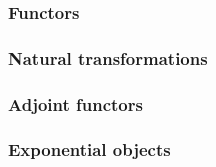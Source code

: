 \subsubsection{Functors}


\subsubsection{Natural transformations}


\subsubsection{Adjoint functors}


\subsubsection{Exponential objects}

